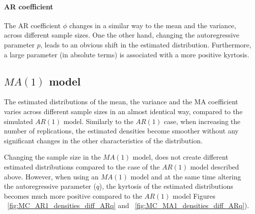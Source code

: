 \documentclass{article}
\begin{document}
\paragraph{AR coefficient}
The AR coefficient $\phi$ changes in a similar way to the mean and the variance, across different sample sizes. One the other hand, changing the autoregressive parameter $p$, leads to an obvious shift in the estimated distribution. Furthermore, a large parameter (in absolute terms) is associated with a more positive kyrtosis.


\subsection{$MA(1)$ model}
The estimated distributions of the mean, the variance and the MA coefficient varies across different sample sizes in an almost identical way, compared to the simulated $AR(1)$ model. Similarly to the $AR(1)$ case, when increasing the number of replications, the estimated densities become smoother without any significant changes in the other characteristics of the distribution.
\par
Changing the sample size in the $MA(1)$ model, does not create different estimated distributions compared to the case of the $AR(1)$ model described above. However, when using an $MA(1)$ model and at the same time altering the autoregressive parameter ($q$), the kyrtosis of the estimated distributions becomes much more positive compared to the $AR(1)$ model Figures ~\ref{fig:MC_AR1_densities_diff_ARq} and ~\ref{fig:MC_MA1_densities_diff_ARq}).


\end{document}
